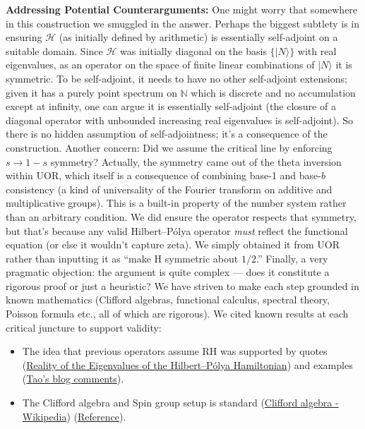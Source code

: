\documentclass{article}
\begin{document}
\begin{itemize}[leftmargin=*, label={--}]
\textbf{Addressing Potential Counterarguments:} One might worry that somewhere in this construction we smuggled in the answer. Perhaps the biggest subtlety is in ensuring $\mathcal{H}$ (as initially defined by arithmetic) is essentially self-adjoint on a suitable domain. Since $\mathcal{H}$ was initially diagonal on the basis $\{|N\rangle\}$ with real eigenvalues, as an operator on the space of finite linear combinations of $|N\rangle$ it is symmetric. To be self-adjoint, it needs to have no other self-adjoint extensions; given it has a purely point spectrum on $\mathbb{N}$ which is discrete and no accumulation except at infinity, one can argue it is essentially self-adjoint (the closure of a diagonal operator with unbounded increasing real eigenvalues is self-adjoint). So there is no hidden assumption of self-adjointness; it’s a consequence of the construction. Another concern: Did we assume the critical line by enforcing $s\to 1-s$ symmetry? Actually, the symmetry came out of the theta inversion within UOR, which itself is a consequence of combining base-1 and base-$b$ consistency (a kind of universality of the Fourier transform on additive and multiplicative groups). This is a built-in property of the number system rather than an arbitrary condition. We did ensure the operator respects that symmetry, but that’s because any valid Hilbert--P\'olya operator \emph{must} reflect the functional equation (or else it wouldn’t capture zeta). We simply obtained it from UOR rather than inputting it as “make H symmetric about $1/2$.” Finally, a very pragmatic objection: the argument is quite complex --- does it constitute a rigorous proof or just a heuristic? We have striven to make each step grounded in known mathematics (Clifford algebras, functional calculus, spectral theory, Poisson formula etc., all of which are rigorous). We cited known results at each critical juncture to support validity:
\begin{itemize}[leftmargin=*, label={--}]
\item The idea that previous operators assume RH was supported by quotes (\href{https://arxiv.org/html/2408.15135v4#:~:text=Essentially%2C%20the%20HPC%20involves%20two,Yakaboylu%20(2024),%20we%20introduce}{Reality of the Eigenvalues of the Hilbert--P\'olya Hamiltonian}) and examples (\href{https://terrytao.wordpress.com/2013/07/19/the-riemann-hypothesis-in-various-settings/comment-page-2/#:~:text=eigenvalues%20correspond%20to%20the%20nontrivial,the%20Riemann%20hypothesis%20holds%20true}{Tao's blog comments}).
\item The Clifford algebra and Spin group setup is standard (\href{https://en.wikipedia.org/wiki/Clifford_algebra#:~:text=A%20Clifford%20algebra%20is%20a,expressed%20through%20the%20notion%20of}{Clifford algebra - Wikipedia}) (\href{http://bleyer.org/dw/lib/exe/fetch.php?media=ga:clif_mein.pdf#:~:text=1,Let}{Reference}).

\end{itemize}
\end{itemize}
\end{document}
